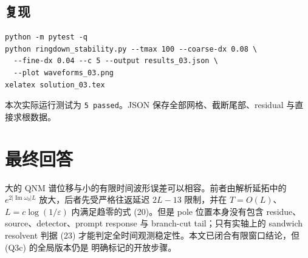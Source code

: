 \documentclass[UTF8,11pt,a4paper]{ctexart}
\theoremstyle{definition}
\newcommand{\eps}{\varepsilon}
\newcommand{\om}{\omega}
\begin{document}
\begin{samepage}
\subsection*{复现}
\begin{lstlisting}
python -m pytest -q
python ringdown_stability.py --tmax 100 --coarse-dx 0.08 \
  --fine-dx 0.04 --c 5 --output results_03.json \
  --plot waveforms_03.png
xelatex solution_03.tex
\end{lstlisting}
本次实际运行测试为 \texttt{5 passed}。JSON 保存全部网格、截断尾部、residual 与直接求根数据。
\end{samepage}

\section*{最终回答}

大的 QNM 谱位移与小的有限时间波形误差可以相容。前者由解析延拓中的
$e^{2|\operatorname{Im}\om_0|L}$ 放大，后者先受严格往返延迟 $2L-13$ 限制，并在
$T=O(L)$、$L=c\log(1/\eps)$ 内满足趋零的式 (20)。但是 pole 位置本身没有包含 residue、
source、detector、prompt response 与 branch-cut tail；只有实轴上的 sandwich resolvent
判据 (23) 才能判定全时间观测稳定性。本文已闭合有限窗口结论，但 (Q3c) 的全局版本仍是
明确标记的开放步骤。
\end{document}
